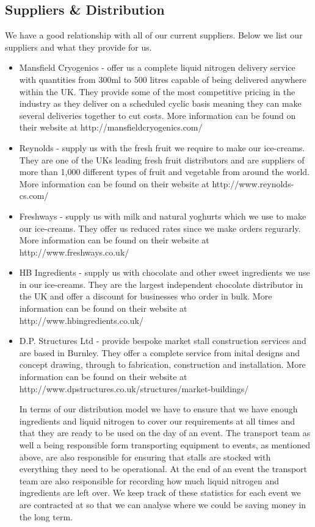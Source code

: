 \documentclass{article}
\begin{document}
  \subsection{Suppliers \& Distribution}

  We have a good relationship with all of our current suppliers. Below we list our suppliers and what they provide for us.

  \begin{itemize}
  \item Mansfield Cryogenics - offer us a complete liquid nitrogen delivery service with quantities from 300ml to 500 litres capable of being delivered anywhere within the UK. They provide some of the most competitive pricing in the industry as they deliver on a scheduled cyclic basis meaning they can make several deliveries together to cut costs. More information can be found on their website at http://mansfieldcryogenics.com/

  \item Reynolds - supply us with the fresh fruit we require to make our ice-creams. They are one of the UKs leading fresh fruit distributors and are suppliers of more than 1,000 different types of fruit and vegetable from around the world. More information can be found on their website at http://www.reynolds-cs.com/

  \item Freshways - supply us with milk and natural yoghurts which we use to make our ice-creams. They offer us reduced rates since we make orders regurarly. More information can be found on their website at http://www.freshways.co.uk/

  \item HB Ingredients - supply us with chocolate and other sweet ingredients we use in our ice-creams. They are the largest independent chocolate distributor in the UK and offer a discount for businesses who order in bulk. More information can be found on their website at http://www.hbingredients.co.uk/

  \item D.P. Structures Ltd - provide bespoke market stall construction services and are based in Burnley. They offer a complete service from inital designs and concept drawing, through to fabrication, construction and installation. More information can be found on their website at\\
   http://www.dpstructures.co.uk/structures/market-buildings/

  In terms of our distribution model we have to ensure that we have enough ingredients and liquid nitrogen to cover our requirements at all times and that they are ready to be used on the day of an event. The transport team as well a being responsible form transporting equipment to events, as mentioned above, are also responsible for ensuring that stalls are stocked with everything they need to be operational. At the end of an event the transport team are also responsible for recording how much liquid nitrogen and ingredients are left over. We keep track of these statistics for each event we are contracted at so that we can analyse where we could be saving money in the long term.
  \end{itemize}
\end{document}
